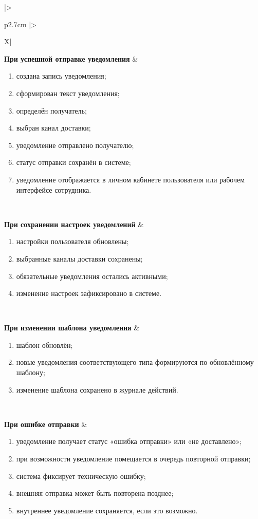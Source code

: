 \documentclass[12pt,a4paper]{article}
\begin{document}
\begin{xltabular}{\textwidth}{
				|>{\raggedright\arraybackslash}p{2.7cm}
				|>{\raggedright\arraybackslash}X|
			}
			\textbf{При успешной отправке уведомления} &
			\begin{enumerate}
				\item создана запись уведомления;
				\item сформирован текст уведомления;
				\item определён получатель;
				\item выбран канал доставки;
				\item уведомление отправлено получателю;
				\item статус отправки сохранён в системе;
				\item уведомление отображается в личном кабинете пользователя или
				рабочем интерфейсе сотрудника.
			\end{enumerate} \\
			\hline
			
			\textbf{При сохранении настроек уведомлений} &
			\begin{enumerate}
				\item настройки пользователя обновлены;
				\item выбранные каналы доставки сохранены;
				\item обязательные уведомления остались активными;
				\item изменение настроек зафиксировано в системе.
			\end{enumerate} \\
			\hline
			
			\textbf{При изменении шаблона уведомления} &
			\begin{enumerate}
				\item шаблон обновлён;
				\item новые уведомления соответствующего типа формируются по
				обновлённому шаблону;
				\item изменение шаблона сохранено в журнале действий.
			\end{enumerate} \\
			\hline
			
			\textbf{При ошибке отправки} &
			\begin{enumerate}
				\item уведомление получает статус «ошибка отправки» или «не доставлено»;
				\item при возможности уведомление помещается в очередь повторной
				отправки;
				\item система фиксирует техническую ошибку;
				\item внешняя отправка может быть повторена позднее;
				\item внутреннее уведомление сохраняется, если это возможно.
			\end{enumerate} \\
			\hline
			

\end{xltabular}
\end{document}
